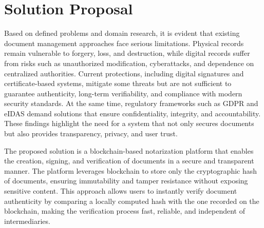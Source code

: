\chapter{Solution Proposal}
Based on defined problems and domain research, it is evident that existing document management approaches face serious limitations. Physical records remain vulnerable to forgery, loss, and destruction, while digital records suffer from risks such as unauthorized modification, cyberattacks, and dependence on centralized authorities. Current protections, including digital signatures and certificate-based systems, mitigate some threats but are not sufficient to guarantee authenticity, long-term verifiability, and compliance with modern security standards. At the same time, regulatory frameworks such as GDPR and eIDAS demand solutions that ensure confidentiality, integrity, and accountability. These findings highlight the need for a system that not only secures documents but also provides transparency, privacy, and user trust.

The proposed solution is a blockchain-based notarization platform that enables the creation, signing, and verification of documents in a secure and transparent manner. The platform leverages blockchain to store only the cryptographic hash of documents, ensuring immutability and tamper resistance without exposing sensitive content. This approach allows users to instantly verify document authenticity by comparing a locally computed hash with the one recorded on the blockchain, making the verification process fast, reliable, and independent of intermediaries.

